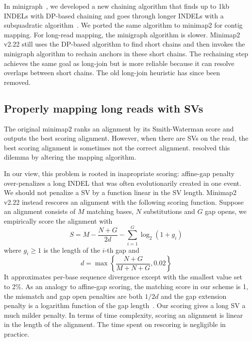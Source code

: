 \documentclass{bioinfo}
\begin{document}
\begin{methods}
In minigraph~\citep{Li:2020aa}, we developed a new chaining algorithm that
finds up to 1kb INDELs with DP-based chaining and goes through longer INDELs with a
subquadratic algorithm~\citep{DBLP:conf/wabi/AbouelhodaO03}. We ported the same
algorithm to minimap2 for contig mapping. For long-read mapping, the minigraph
algorithm is slower. Minimap2 v2.22 still uses the DP-based algorithm to
find short chains and then invokes the minigraph algorithm to rechain anchors in
these short chains. The rechaining step achieves the same goal as long-join
but is more reliable because it can resolve overlaps between short chains. The old
long-join heuristic has since been removed.

\subsection{Properly mapping long reads with SVs}
The original minimap2 ranks an alignment by its Smith-Waterman score and
outputs the best scoring alignment. However, when there are SVs on the read,
the best scoring alignment is sometimes not the correct alignment.
\citet{Jain2020.11.01.363887} resolved this dilemma by altering the mapping
algorithm.

In our view, this problem is rooted in inapropriate scoring: affine-gap penalty
over-penalizes a long INDEL that was often evolutionarily created in one event.
We should not penalize a SV by a function linear in the SV length. Minimap2 v2.22 instead rescores
an alignment with the following scoring function. Suppose an alignment consists
of $M$ matching bases, $N$ substitutions and $G$ gap opens, we empirically
score the alignment with
$$
S=M-\frac{N+G}{2d}-\sum_{i=1}^G\log_2(1+g_i)
$$
where $g_i\ge1$ is the length of the $i$-th gap and
$$
d=\max\left\{\frac{N+G}{M+N+G},0.02\right\}
$$
It approximates per-base sequence divergence except with the smallest value set
to 2\%. As an analogy to affine-gap scoring, the matching score in our scheme
is 1, the mismatch and gap open penalties are both $1/2d$ and the gap extension
penalty is a logarithm function of the gap length~\citep{Gu:1995wt}. Our scoring gives a long SV
a much milder penalty. In terms of time complexity, scoring an alignment is
linear in the length of the alignment. The time spent on rescoring is negligible in
practice.


\end{methods}
\end{document}
